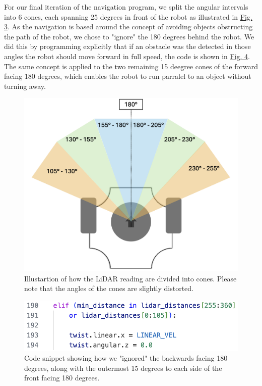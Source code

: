 \documentclass[conference]{IEEEtran}
\begin{document}
For our final iteration of the navigation program, we split the angular intervals into 6 cones, each spanning 25 degrees in front of the robot as illustrated in \href{sec:angles}{Fig. 3}. 
As the navigation is based around the concept of avoiding objects obstructing the path of the robot, we chose to "ignore" the 180 degrees behind the robot. 
We did this by programming explicitly that if an obstacle was the detected in those angles the robot should move forward in full speed, the code is shown in \href{sec:ignore}{Fig. 4}.
The same concept is applied to the two remaining 15 deegree cones of the forward facing 180 degrees, which enables the robot to run parralel to an object without turning away.
\begin{figure}[t]
    \centerline{\includegraphics[width=1.0\columnwidth]{Pictures/LiDAR Angels.png}}
    \caption{Illustartion of how the LiDAR reading are divided into cones.
    Please note that the angles of the cones are slightly distorted.}
    \label{sec:angles}
    \end{figure}
\begin{figure}[htbp]
    \centerline{\includegraphics[width=1.0\columnwidth\hspace{0.0cm}]{Pictures/ignore.png}}
    \caption{Code snippet showing how we "ignored" the backwards facing 180 degrees, along with the outermost 15 degrees to each side of the front facing 180 degrees.}
    \label{sec:ignore}
    \end{figure}
\end{document}
